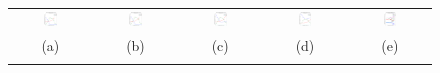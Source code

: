 \documentclass{IEEEtran}
\begin{document}
\begin{figure}[t]
\centering
\begin{tabular}{@{}c c c c c@{}} %
\includegraphics[width=0.18\textwidth]{figs/synthetic/syn_lines_g2d_scales_0} &
\includegraphics[width=0.18\textwidth]{figs/synthetic/syn_lines_g2d_scales_1} &
\includegraphics[width=0.18\textwidth]{figs/synthetic/syn_lines_g2d_scales_2} &
\includegraphics[width=0.18\textwidth]{figs/synthetic/syn_lines_g2d_scales_3} &
\includegraphics[width=0.18\textwidth]{figs/retina/ret_vessels_g2d_scales} \\
(a) & (b) & (c) & (d) & (e)\\
\noalign{\smallskip}


\end{tabular}
\end{figure}
\end{document}
